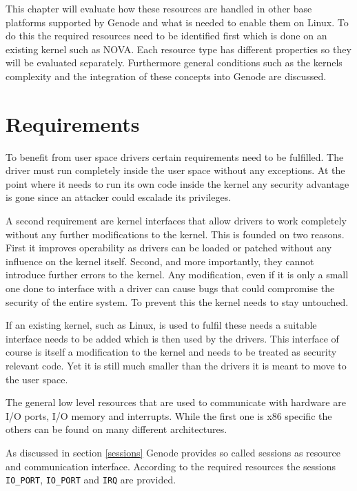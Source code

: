 \documentclass[
a4paper,
12pt,
notitlepage,
parskip=half,
DIV=11,
]{scrbook}
\begin{document}
		This chapter will evaluate how these resources are handled in other base platforms supported by Genode and what is needed to enable them on Linux.
		To do this the required resources need to be identified first which is done on an existing kernel such as NOVA.
		Each resource type has different properties so they will be evaluated separately.
		Furthermore general conditions such as the kernels complexity and the integration of these concepts into Genode are discussed.
		
		\section{Requirements}
		
		
		To benefit from user space drivers certain requirements need to be fulfilled.
		The driver must run completely inside the user space without any exceptions.
		At the point where it needs to run its own code inside the kernel any security advantage is gone since an attacker could escalade its privileges.
		
		A second requirement are kernel interfaces that allow drivers to work completely without any further modifications to the kernel.
		This is founded on two reasons.
		First it improves operability as drivers can be loaded or patched without any influence on the kernel itself.
		Second, and more importantly, they cannot introduce further errors to the kernel.
		Any modification, even if it is only a small one done to interface with a driver can cause bugs that could compromise the security of the entire system.
		To prevent this the kernel needs to stay untouched.
		
		If an existing kernel, such as Linux, is used to fulfil these needs a suitable interface needs to be added which is then used by the drivers.
		This interface of course is itself a modification to the kernel and needs to be treated as security relevant code.
		Yet it is still much smaller than the drivers it is meant to move to the user space.
		
		The general low level resources that are used to communicate with hardware are I/O ports, I/O memory and interrupts.
		While the first one is x86 specific the others can be found on many different architectures.
		
		As discussed in section \ref{sessions} Genode provides so called sessions as resource and communication interface.
		According to the required resources the sessions \texttt{IO\_PORT}, \texttt{IO\_PORT} and \texttt{IRQ} are provided.
		
\end{document}
